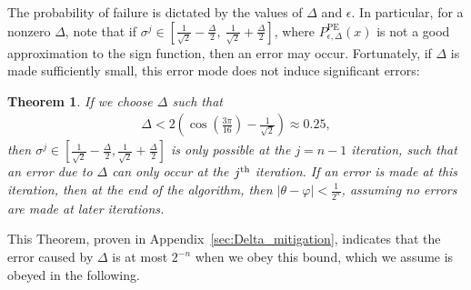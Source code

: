 \documentclass[aps,pra,showpacs,notitlepage,twocolumn,superscriptaddress,nofootinbib]{revtex4-1}
\newtheorem{theorem}{Theorem}
\begin{document}
    The probability of failure is dictated by the values of $\Delta$ and $\epsilon$. In particular, for a nonzero $\Delta$, note that if $\sigma^j \in \left[\frac{1}{\sqrt{2}} - \frac{\Delta}{2}, \ \frac{1}{\sqrt{2}} + \frac{\Delta}{2}\right]$, where $P^{\text{PE}}_{\epsilon,\Delta}(x)$ is not a good approximation to the sign function, then an error may occur. Fortunately, if $\Delta$ is made sufficiently small, this error mode does not induce significant errors:
    \begin{theorem}\label{thm:Delta_restriction}
    If we choose $\Delta$ such that 
        \begin{equation}
        \begin{gathered}
            \Delta < 2\left(\cos(\frac{3\pi}{16}) - \frac{1}{\sqrt{2}} \right) \approx 0.25,
        \end{gathered}
        \end{equation}
    then $\sigma^j \in \left[\frac{1}{\sqrt{2}} - \frac{\Delta}{2}, \frac{1}{\sqrt{2}} + \frac{\Delta}{2} \right]$ is only possible at the $j=n-1$ iteration, such that an error due to $\Delta$ can only occur at the $j\textsuperscript{th}$ iteration. If an error is made at this iteration, then at the end of the algorithm, then $|\theta - \varphi| < \frac{1}{2^n}$, assuming no errors are made at later iterations.
    \end{theorem}
    \noindent This Theorem, proven in Appendix~\ref{sec:Delta_mitigation}, indicates that the error caused by $\Delta$ is at most $2^{-n}$ when we obey this bound, which we assume is obeyed in the following.
    
\end{document}
